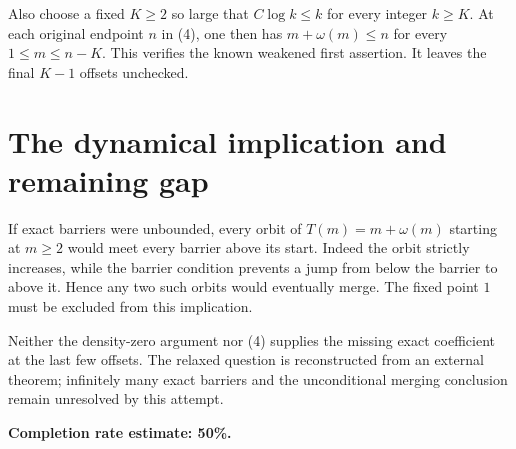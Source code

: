 \documentclass[11pt]{article}
\begin{document}
Also choose a fixed $K\ge2$ so large that $C\log k\le k$ for every integer $k\ge K$. At each original endpoint $n$ in (4), one then has $m+\omega(m)\le n$ for every $1\le m\le n-K$. This verifies the known weakened first assertion. It leaves the final $K-1$ offsets unchecked.

\section*{The dynamical implication and remaining gap}
If exact barriers were unbounded, every orbit of $T(m)=m+\omega(m)$ starting at $m\ge2$ would meet every barrier above its start. Indeed the orbit strictly increases, while the barrier condition prevents a jump from below the barrier to above it. Hence any two such orbits would eventually merge. The fixed point $1$ must be excluded from this implication.

Neither the density-zero argument nor (4) supplies the missing exact coefficient at the last few offsets. The relaxed question is reconstructed from an external theorem; infinitely many exact barriers and the unconditional merging conclusion remain unresolved by this attempt.

\textbf{Completion rate estimate: 50\%.}
\end{document}
